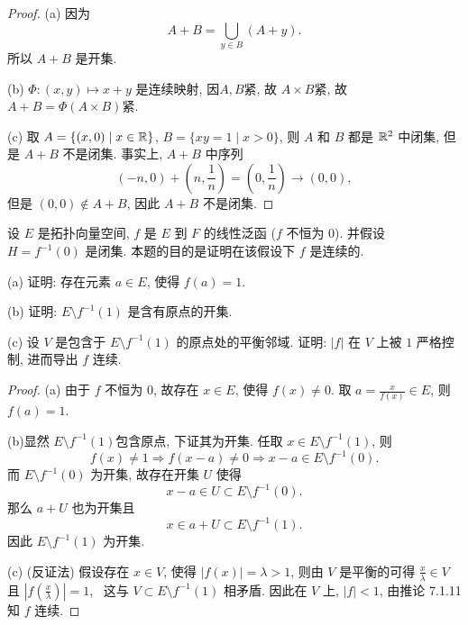\begin{proof}
    (a) 因为
    \[A+B=\bigcup_{y\in B}(A+y).\]
    所以 $A+B$ 是开集.

    (b) $\varPhi:(x,y)\mapsto x+y$ 是连续映射, 因$A,B$紧, 故 $A\times B$紧, 故 $A+B=\varPhi(A\times B)$紧.

    (c) 取 $A=\{(x,0)\mid x\in\mathbb{R}\}$, $B=\{xy=1\mid x>0\}$,
    则 $A$ 和 $B$ 都是 $\mathbb{R}^2$ 中闭集, 但是 $A+B$ 不是闭集.
    事实上, $A+B$ 中序列
    \[(-n,0)+(n,\frac{1}{n})=(0,\frac{1}{n})\to (0,0),\]
    但是 $(0,0)\notin A+B$, 因此 $A+B$ 不是闭集.
\end{proof}



\begin{exercise}
    设 $E$ 是拓扑向量空间, $f$ 是 $E$ 到 $F$ 的线性泛函 ($f$ 不恒为 $0$). 
    并假设 $H=f^{-1}(0)$ 是闭集. 本题的目的是证明在该假设下 $f$ 是连续的.

    (a) 证明: 存在元素 $a\in E$, 使得 $f(a)=1$.

    (b) 证明: $E\setminus f^{-1}(1)$ 是含有原点的开集.

    (c) 设 $V$ 是包含于 $E\setminus f^{-1}(1)$ 的原点处的平衡邻域. 证明: $|f|$ 在 $V$ 上被 $1$ 严格控制, 进而导出 $f$ 连续.
\end{exercise}

\begin{proof}
    (a) 由于 $f$ 不恒为 $0$, 故存在 $x\in E$, 使得 $f(x)\neq 0$.
    取 $a=\frac{x}{f(x)}\in E$, 则 $f(a)=1$.

    (b)显然 $E\setminus f^{-1}(1)$包含原点,
    下证其为开集. 任取 $x\in E\setminus f^{-1}(1)$, 则 
    \[f(x)\neq 1\Rightarrow f(x-a)\neq 0\Rightarrow x-a\in E\setminus f^{-1}(0).\]
    而 $E\setminus f^{-1}(0)$ 为开集, 故存在开集 $U$ 使得 
    \[x-a\in U\subset E\setminus f^{-1}(0).\]
    那么 $a+U$ 也为开集且
    \[x\in a+U\subset E\setminus f^{-1}(1).\]
    因此 $E\setminus f^{-1}(1)$ 为开集.

    (c) (反证法) 假设存在 $x\in V$, 使得 $|f(x)|=\lambda>1$,
    则由 $V$ 是平衡的可得 $\frac{x}{\lambda}\in V$ 且 $|f(\frac{x}{\lambda})|=1$, \
    这与 $V\subset E\setminus f^{-1}(1)$ 相矛盾.
    因此在 $V$ 上, $|f|<1$, 由推论 7.1.11 知 $f$ 连续.
\end{proof}




